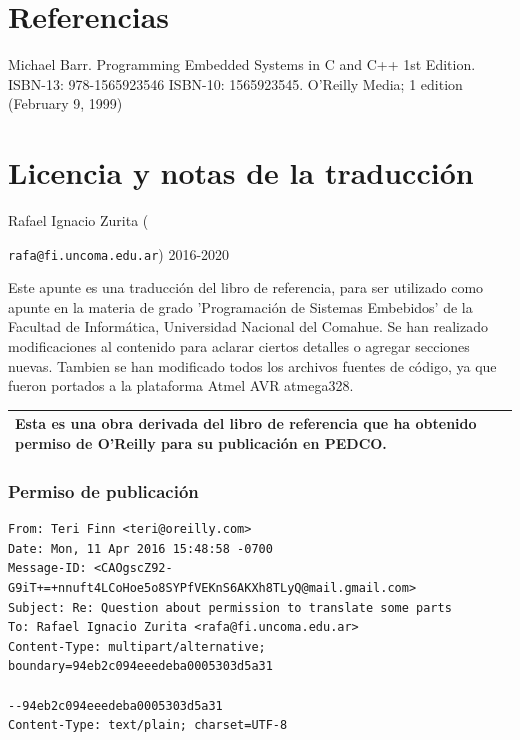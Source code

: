 \documentclass[output=paper, 
colorlinks,
citecolor=brown,
newtxmath
]{langscibook}
\begin{document}
\pagebreak

\section{Referencias}

Michael Barr. Programming Embedded Systems in C and C++ 1st Edition. ISBN-13: 978-1565923546
ISBN-10: 1565923545. O'Reilly Media; 1 edition (February 9, 1999)


\section*{Licencia y notas de la traducción}

Rafael Ignacio Zurita ({\texttt{rafa@fi.uncoma.edu.ar}) 2016-2020

Este apunte es una traducción del libro de referencia, para
ser utilizado como apunte en la materia de grado
'Programación de Sistemas Embebidos' de la Facultad de Informática,
Universidad Nacional del Comahue.
Se han realizado modificaciones
al contenido para aclarar ciertos detalles o agregar secciones nuevas.
 Tambien se han
modificado todos los archivos fuentes de código, ya que fueron
portados a la plataforma Atmel AVR atmega328.


\begin{center}
\begin{tabularx}{\textwidth}{|X|}
\hline
\rowcolor{aliceblue}
\textbf{Esta es una obra derivada del libro de referencia que ha obtenido permiso de O'Reilly para su publicación en PEDCO.}\\
\hline
\end{tabularx}
\end{center}



\subsubsection*{Permiso de publicación}

\begin{small}
\begin{verbatim}
From: Teri Finn <teri@oreilly.com>
Date: Mon, 11 Apr 2016 15:48:58 -0700
Message-ID: <CAOgscZ92-G9iT+=+nnuft4LCoHoe5o8SYPfVEKnS6AKXh8TLyQ@mail.gmail.com>
Subject: Re: Question about permission to translate some parts
To: Rafael Ignacio Zurita <rafa@fi.uncoma.edu.ar>
Content-Type: multipart/alternative; boundary=94eb2c094eeedeba0005303d5a31

--94eb2c094eeedeba0005303d5a31
Content-Type: text/plain; charset=UTF-8


\end{verbatim}
\end{small}}
\end{document}
